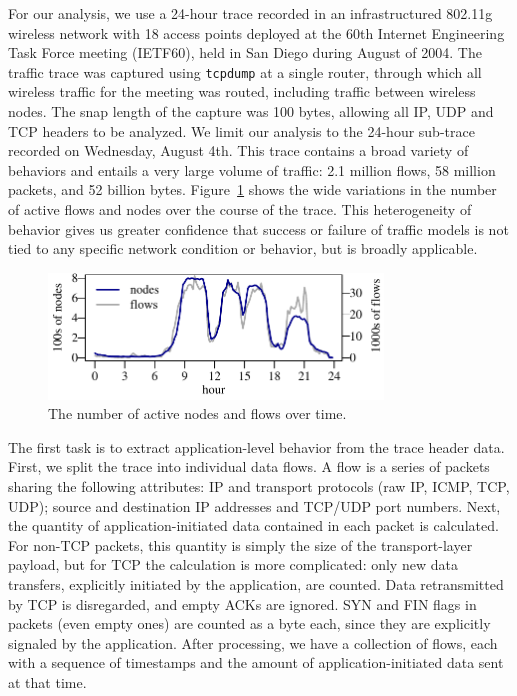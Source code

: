 \documentclass[conference]{IEEEtran}
\newcommand{\caps}[1]{{\small{#1}}}
\begin{document}
For our analysis, we use a 24-hour trace recorded in an infrastructured 802.11g wireless network with 18 access points deployed at the 60th Internet Engineering Task Force meeting (\caps{IETF}60), held in San Diego during August of 2004.  The traffic trace was captured using \texttt{\small{tcpdump}} at a single router, through which all wireless traffic for the meeting was routed, including traffic between wireless nodes. The snap length of the capture was 100 bytes, allowing all \caps{IP}, \caps{UDP} and \caps{TCP} headers to be analyzed. We limit our analysis to the 24-hour sub-trace recorded on Wednesday, August 4th. This trace contains a broad variety of behaviors and entails a very large volume of traffic: 2.1 million flows, 58 million packets, and 52 billion bytes.
Figure~\ref{fig:nodes-flows} shows the wide variations in the number of active flows and nodes over the course of the trace. This heterogeneity of behavior gives us greater confidence that success or failure of traffic models is not tied to any specific network condition or behavior, but is broadly applicable.

\begin{figure}[t]
\begin{center}
\includegraphics[width=3.5in]{nodes-flows}%
\vspace{-0.75em}%
\caption{The number of active nodes and flows over time.} 
\label{fig:nodes-flows}
\end{center}
\vspace{-2.25em}
\end{figure}

The first task is to extract application-level behavior from the trace header data. First, we split the trace into individual data flows. A flow is a series of packets sharing the following attributes: \caps{IP} and transport protocols (raw \caps{IP}, \caps{ICMP}, \caps{TCP}, \caps{UDP}); source and destination \caps{IP} addresses and \caps{TCP}/\caps{UDP} port numbers. Next, the quantity of application-initiated data contained in each packet is calculated. For non-\caps{TCP} packets, this quantity is simply the size of the transport-layer payload, but for \caps{TCP} the calculation is more complicated: only new data transfers, explicitly initiated by the application, are counted. Data retransmitted by TCP is disregarded, and empty ACKs are ignored. SYN and FIN flags in packets (even empty ones) are counted as a byte each, since they are explicitly signaled by the application.
After processing, we have a collection of flows, each with a sequence of timestamps and the amount of application-initiated data sent at that time.
\end{document}
